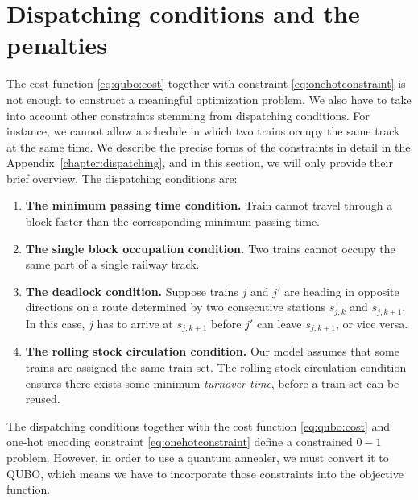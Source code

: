 \section{Dispatching conditions and the penalties}
The cost function \eqref{eq:qubo:cost} together with constraint
\eqref{eq:onehotconstraint} is not enough to construct a meaningful
optimization problem. We also have to take into account other constraints
stemming from dispatching conditions. For instance, we cannot allow a schedule
in which two trains occupy the same track at the same time. We describe the
precise forms of the constraints in detail in the
Appendix~\ref{chapter:dispatching}, and in this section, we will only provide
their brief overview. The dispatching conditions are:
\begin{enumerate}
  \item \textbf{The minimum passing time condition.} Train cannot travel through a block faster than the corresponding minimum passing time.
  \item \textbf{The single block occupation condition.} Two trains cannot occupy the same part of a single railway track.
  \item \textbf{The deadlock condition.} Suppose trains $j$ and $j'$ are
    heading in opposite directions on a route determined by two consecutive
    stations $s_{j,k}$ and $s_{j,k+1}$. In this case, $j$ has to arrive at $s_{j,k+1}$ before $j'$ can leave $s_{j,k+1}$, or vice versa.
  \item \textbf{The rolling stock circulation condition.} Our model assumes that some trains are assigned the same train set. The rolling stock circulation condition ensures there exists some minimum \emph{turnover time}, before a train set can be reused.
\end{enumerate}

The dispatching conditions together with the cost function \eqref{eq:qubo:cost}
and one-hot encoding constraint \eqref{eq:onehotconstraint} define a
constrained $0-1$ problem. However, in order to use a quantum annealer, we must
convert it to QUBO, which means we have to incorporate those constraints into
the objective function.

